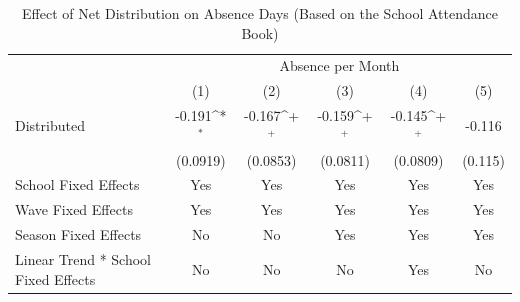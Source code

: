 \documentclass[fleqn,11pt]{article}
\newcommand{\sym}[1]{\rlap{$#1$}}
\def\sym#1{\ifmmode^{#1}\else\(^{#1}\)\fi
}
\begin{document}
% 
\begin{table}[h]
\caption{Effect of Net Distribution on Absence Days (Based on the School Attendance
Book)}
\label{t:olsabsper_dailyattend_monthly_withtrend_child}\centering
\begin{adjustbox}{max width=\textwidth}
\begin{threeparttable}
\begin{tabular}{l*{5}{c}}
\hline\hline
&\multicolumn{5}{c}{Absence per Month}\\ \cmidrule(lr){2-6}
                    &\multicolumn{1}{c}{(1)}&\multicolumn{1}{c}{(2)}&\multicolumn{1}{c}{(3)}&\multicolumn{1}{c}{(4)}&\multicolumn{1}{c}{(5)}\\\hline
Distributed           &      -0.191\sym{*}  &      -0.167\sym{+}  &      -0.159\sym{+}  &      -0.145\sym{+}  &      -0.116         \\
                    &    (0.0919)         &    (0.0853)         &    (0.0811)         &    (0.0809)         &     (0.115)         \\

School Fixed Effects           &         Yes         &         Yes         &         Yes         &         Yes         &         Yes         \\

Wave Fixed Effects            &         Yes         &         Yes         &         Yes         &         Yes         &         Yes         \\

Season Fixed Effects            &          No         &          No         &         Yes         &         Yes         &          Yes         \\

Linear Trend * School Fixed Effects &          No         &          No         &          No         &         Yes         &          No         \\


\end{tabular}
\end{threeparttable}
\end{adjustbox}
\end{table}
\end{document}
